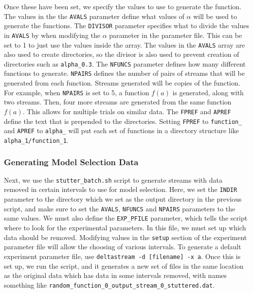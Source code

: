 \documentclass[a4paper,11pt]{article}
\begin{document}
\begin{appendices}
    Once these have been set, we specify the values to use to generate the
    function. The values in the the \texttt{AVALS} parameter define what values of
    $\alpha$ will be used to generate the functions. The \texttt{DIVISOR} parameter
    specifies what to divide the values in \texttt{AVALS} by when modifying the
    $\alpha$ parameter in the parameter file. This can be set to 1 to just use the
    values inside the array. The values in the \texttt{AVALS} array are also used to
    create directories, so the divisor is also used to prevent creation of
    directories such as \texttt{alpha\_0.3}. The \texttt{NFUNCS} parameter defines
    how many different functions to generate. \texttt{NPAIRS} defines the number of
    pairs of streams that will be generated from each function. Streams generated
    will be copies of the function. For example, when \texttt{NPAIRS} is set to 5, a
    function $f(a)$ is generated, along with two streams. Then, four more streams
    are generated from the same function $f(a)$. This allows for multiple trials on
    similar data. The \texttt{FPREF} and \texttt{APREF} define the text that is
    prepended to the directories. Setting \texttt{FPREF} to \texttt{function\_} and
    \texttt{APREF} to \texttt{alpha\_} will put each set of functions in a directory
    structure like \texttt{alpha\_1/function\_1}.
\subsubsection{Generating Model Selection Data}
\label{sec-10-3-2}

    Next, we use the \texttt{stutter\_batch.sh} script to generate streams with data
    removed in certain intervals to use for model selection. Here, we set the
    \texttt{INDIR} parameter to the directory which we set as the output directory
    in the previous script, and make sure to set the \texttt{AVALS}, \texttt{NFUNCS}
    and \texttt{NPAIRS} parameters to the same values. We must also define the
    \texttt{EXP\_PFILE} parameter, which tells the script where to look for the
    experimental parameters. In this file, we must set up which data should be
    removed. Modifying values in the \texttt{setup} section of the experiment
    parameter file will allow the choosing of various intervals. To generate a
    default experiment parameter file, use \texttt{deltastream -d [filename] -x
    a}. Once this is set up, we run the script, and it generates a new set of files
    in the same location as the original data which has data in some intervals
    removed, with names something like \texttt{random\_function\_0\_output\_stream\_0\_stuttered.dat}.

\end{appendices}
\end{document}
